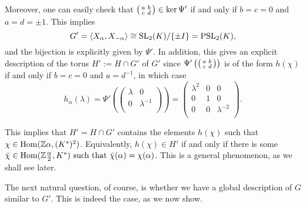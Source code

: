 Moreover, one can easily check that $\begin{psmallmatrix}
    a&b\\
    c&d\\
\end{psmallmatrix}\in\ker\Psi'$ if and only if $b=c=0$ and $a=d=\pm{1}$. This implies
$$G'=\langle X_\alpha,X_{-\alpha}\rangle\cong\mathrm{SL}_2(K)/\{\pm I\}=\mathrm{PSL}_2(K),$$
and the bijection is explicitly given by $\Psi'$. In addition, this gives an explicit description of the torus $H':=H\cap G'$ of $G'$ since $\Psi'\left(\begin{psmallmatrix}
    a&b\\
    c&d\\
\end{psmallmatrix}\right)$ is of the form $h(\chi)$ if and only if $b=c=0$ and $a=d^{-1}$, in which case 
$$h_\alpha(\lambda)=\Psi'\left(\begin{pmatrix}
    \lambda & 0\\
    0 & \lambda^{-1}\\
\end{pmatrix}\right)=\begin{pmatrix}
    \lambda^2 & 0 & 0\\
    0 & 1 & 0\\
    0 & 0 & \lambda^{-2}\\
\end{pmatrix}.$$

This implies that $H'=H\cap G'$ contains the elements $h(\chi)$ such that $\chi\in\mathrm{Hom}(\mathbb{Z}\alpha,(K^*)^2)$. Equivalently, $h(\chi)\in H'$ if and only if there is some $\bar\chi\in\mathrm{Hom}(\mathbb{Z}\frac{\alpha}{2},K^*)\text{ such that }\bar\chi(\alpha)=\chi(\alpha)$. This is a general phenomenon, as we shall see later.

The next natural question, of course, is whether we have a global description of $G$ similar to $G'$. This is indeed the case, as we now show.

